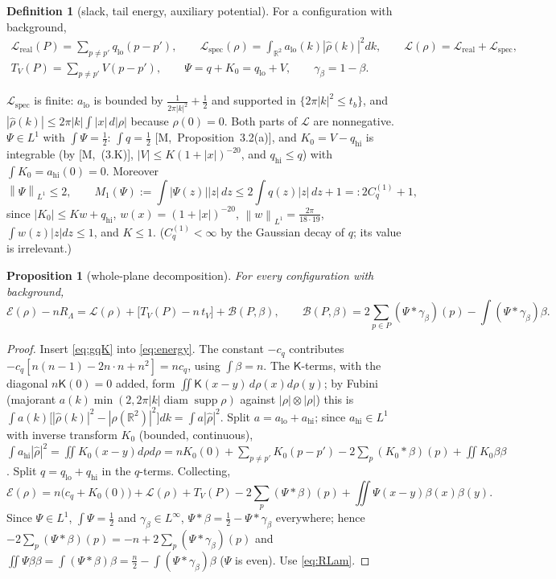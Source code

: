 \documentclass[11pt,reqno]{amsart}
\numberwithin{equation}{section}
\theoremstyle{plain}
\newtheorem{proposition}[theorem]{Proposition}
\theoremstyle{definition}
\newtheorem{definition}[theorem]{Definition}
\newcommand{\R}{\mathbb{R}}
\newcommand{\Lam}{\Lambda}
\newcommand{\supp}{\operatorname{supp}}
\newcommand{\lo}{\mathrm{lo}}
\newcommand{\hi}{\mathrm{hi}}
\newcommand{\spec}{\mathrm{spec}}
\newcommand{\norm}[1]{\left\|#1\right\|}
\newcommand{\cL}{\mathcal{L}}
\newcommand{\cE}{\mathcal{E}}
\newcommand{\cB}{\mathcal{B}}
\newcommand{\ms}[1]{\textup{[M,~#1]}}
\begin{document}
\begin{definition}[slack, tail energy, auxiliary potential]\label{def:planeslack}
For a configuration with background,
\begin{gather*}
\cL_{\mathrm{real}}(P)=\sum_{p\ne p'}q_\lo(p-p'),\qquad\cL_\spec(\rho)=\int_{\R^2}a_\lo(k)|\widehat\rho(k)|^2dk,\qquad\cL(\rho)=\cL_{\mathrm{real}}+\cL_\spec,\\
T_V(P)=\sum_{p\ne p'}V(p-p'),\qquad\Psi=q+K_0=q_\lo+V,\qquad\gamma_\beta=1-\beta .
\end{gather*}
\end{definition}
$\cL_\spec$ is finite: $a_\lo$ is bounded by $\frac1{2\pi|k|^2}+\frac12$ and supported in $\{2\pi|k|^2\le t_b\}$, and $|\widehat\rho(k)|\le2\pi|k|\int|x|\,d|\rho|$ because $\widehat\rho(0)=0$.  Both parts of $\cL$ are nonnegative.  $\Psi\in L^1$ with $\int\Psi=\frac12$: $\int q=\frac12$ \ms{Proposition~3.2(a)}, and $K_0=V-q_\hi$ is integrable (by \ms{(3.K)}, $|V|\le K(1+|x|)^{-20}$, and $q_\hi\le q$) with $\int K_0=a_\hi(0)=0$.  Moreover
\begin{equation}\label{eq:Psinorms}
\norm\Psi_{L^1}\le2,\qquad M_1(\Psi):=\int|\Psi(z)||z|\,dz\le2\int q(z)|z|\,dz+1=:2C^{(1)}_q+1,
\end{equation}
since $|K_0|\le K w+q_\hi$, $w(x)=(1+|x|)^{-20}$, $\norm w_{L^1}=\frac{2\pi}{18\cdot19}$, $\int w(z)|z|dz\le1$, and $K\le1$.  ($C^{(1)}_q<\infty$ by the Gaussian decay of $q$; its value is irrelevant.)

\begin{proposition}[whole-plane decomposition]\label{prop:planedecomp}
For every configuration with background,
\begin{equation}\label{eq:planedecomp}
\cE(\rho)-nR_\Lam=\cL(\rho)+\big[T_V(P)-n\,t_V\big]+\cB(P,\beta),\qquad\cB(P,\beta)=2\sum_{p\in P}(\Psi*\gamma_\beta)(p)-\int(\Psi*\gamma_\beta)\beta .
\end{equation}
\end{proposition}
\begin{proof}
Insert \eqref{eq:gqK} into \eqref{eq:energy}.  The constant $-c_q$ contributes $-c_q[n(n-1)-2n\cdot n+n^2]=nc_q$, using $\int\beta=n$.  The $\mathsf K$-terms, with the diagonal $n\mathsf K(0)=0$ added, form $\iint\mathsf K(x-y)\,d\rho(x)d\rho(y)$; by Fubini (majorant $a(k)\min(2,2\pi|k|\operatorname{diam}\supp\rho)$ against $|\rho|\otimes|\rho|$) this is $\int a(k)\big[|\widehat\rho(k)|^2-|\rho(\R^2)|^2\big]dk=\int a|\widehat\rho|^2$.  Split $a=a_\lo+a_\hi$; since $a_\hi\in L^1$ with inverse transform $K_0$ (bounded, continuous), $\int a_\hi|\widehat\rho|^2=\iint K_0(x-y)d\rho d\rho=nK_0(0)+\sum_{p\ne p'}K_0(p-p')-2\sum_p(K_0*\beta)(p)+\iint K_0\beta\beta$.  Split $q=q_\lo+q_\hi$ in the $q$-terms.  Collecting,
\[
\cE(\rho)=n\big(c_q+K_0(0)\big)+\cL(\rho)+T_V(P)-2\sum_p(\Psi*\beta)(p)+\iint\Psi(x-y)\beta(x)\beta(y).
\]
Since $\Psi\in L^1$, $\int\Psi=\frac12$ and $\gamma_\beta\in L^\infty$, $\Psi*\beta=\frac12-\Psi*\gamma_\beta$ everywhere; hence $-2\sum_p(\Psi*\beta)(p)=-n+2\sum_p(\Psi*\gamma_\beta)(p)$ and $\iint\Psi\beta\beta=\int(\Psi*\beta)\beta=\frac n2-\int(\Psi*\gamma_\beta)\beta$ ($\Psi$ is even).  Use \eqref{eq:RLam}.
\end{proof}
\end{document}
